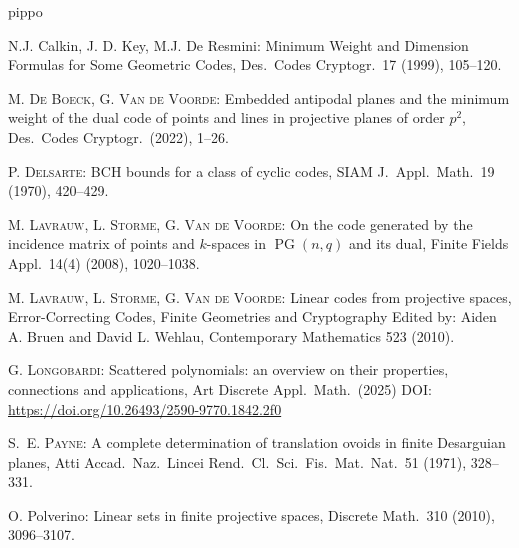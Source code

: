 \documentclass[12pt]{article}
\DeclareMathOperator{\PG}{{PG}}
\begin{document}
\begin{thebibliography}{pippo}
		
		{\sc N.J. Calkin, J. D. Key, M.J. De Resmini:} Minimum Weight and Dimension Formulas for
		Some Geometric Codes, Des.\ Codes Cryptogr.\ 17 (1999), 105--120.
		
		
		
		
		\textsc{M. De Boeck, G. Van de Voorde:} Embedded antipodal planes and the minimum weight of the dual code of points and lines in projective planes of order $p^2$, Des.\ Codes Cryptogr.\ (2022), 1--26.
		
		
		\textsc{P. Delsarte:} BCH bounds for a class of cyclic codes, SIAM J.\ Appl.\ Math.\ 19 (1970), 420--429.
		
		
		
		
		\textsc{M. Lavrauw, L. Storme, G. Van de Voorde:} On the code generated by the incidence matrix of points and $k$-spaces in $\PG(n,q)$ and its dual, Finite Fields Appl.\ 14(4) (2008), 1020--1038.
		
		
		\textsc{M. Lavrauw, L. Storme, G. Van de Voorde:} Linear codes from projective spaces, Error-Correcting Codes, Finite Geometries and Cryptography
		Edited by: Aiden A. Bruen and
		David L. Wehlau, Contemporary Mathematics 523 (2010).
		
		\textsc{G. Longobardi:} Scattered polynomials: an overview on their properties, connections and applications, Art Discrete Appl.\ Math.\ (2025) DOI: \url{https://doi.org/10.26493/2590-9770.1842.2f0}
		
		
		\textsc{S.~E. Payne:}
		A complete determination of translation ovoids in finite Desarguian planes, Atti Accad.\ Naz.\ Lincei Rend.\ Cl.\ Sci.\ Fis.\ Mat.\ Nat.\  51 (1971), 328--331.
		
		{\sc O. Polverino:} Linear sets in finite projective spaces, Discrete Math.\ 310 (2010), 3096--3107.
		
		
		
		
		
		
	\end{thebibliography}
	
\end{document}
